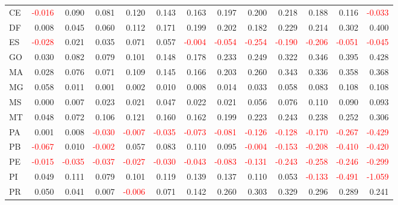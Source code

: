 \begin{table}[!htb]
{\begin{tabular}{lrrrrrrrrrrrr}
      CE & \textcolor{red}{-0.016} & 0.090 & 0.081 & 0.120 & 0.143 & 0.163 & 0.197 & 0.200 & 0.218 & 0.188 & 0.116 & \textcolor{red}{-0.033} \\
      DF & 0.008 & 0.045 & 0.060 & 0.112 & 0.171 & 0.199 & 0.202 & 0.182 & 0.229 & 0.214 & 0.302 & 0.400 \\
      ES & \textcolor{red}{-0.028} & 0.021 & 0.035 & 0.071 & 0.057 & \textcolor{red}{-0.004} & \textcolor{red}{-0.054} & \textcolor{red}{-0.254} & \textcolor{red}{-0.190} & \textcolor{red}{-0.206} & \textcolor{red}{-0.051} & \textcolor{red}{-0.045} \\
      GO & 0.030 & 0.082 & 0.079 & 0.101 & 0.148 & 0.178 & 0.233 & 0.249 & 0.322 & 0.346 & 0.395 & 0.428 \\
      MA & 0.028 & 0.076 & 0.071 & 0.109 & 0.145 & 0.166 & 0.203 & 0.260 & 0.343 & 0.336 & 0.358 & 0.368 \\
      MG & 0.058 & 0.011 & 0.001 & 0.002 & 0.010 & 0.008 & 0.014 & 0.033 & 0.058 & 0.083 & 0.108 & 0.108 \\
      MS & 0.000 & 0.007 & 0.023 & 0.021 & 0.047 & 0.022 & 0.021 & 0.056 & 0.076 & 0.110 & 0.090 & 0.093 \\
      MT & 0.048 & 0.072 & 0.106 & 0.121 & 0.160 & 0.162 & 0.199 & 0.223 & 0.243 & 0.238 & 0.252 & 0.306 \\
      PA & 0.001 & 0.008 & \textcolor{red}{-0.030} & \textcolor{red}{-0.007} & \textcolor{red}{-0.035} & \textcolor{red}{-0.073} & \textcolor{red}{-0.081} & \textcolor{red}{-0.126} & \textcolor{red}{-0.128} & \textcolor{red}{-0.170} & \textcolor{red}{-0.267} & \textcolor{red}{-0.429} \\
      PB & \textcolor{red}{-0.067} & 0.010 & \textcolor{red}{-0.002} & 0.057 & 0.083 & 0.110 & 0.095 & \textcolor{red}{-0.004} & \textcolor{red}{-0.153} & \textcolor{red}{-0.208} & \textcolor{red}{-0.410} & \textcolor{red}{-0.420} \\
      PE & \textcolor{red}{-0.015} & \textcolor{red}{-0.035} & \textcolor{red}{-0.037} & \textcolor{red}{-0.027} & \textcolor{red}{-0.030} & \textcolor{red}{-0.043} & \textcolor{red}{-0.083} & \textcolor{red}{-0.131} & \textcolor{red}{-0.243} & \textcolor{red}{-0.258} & \textcolor{red}{-0.246} & \textcolor{red}{-0.299} \\
      PI & 0.049 & 0.111 & 0.079 & 0.101 & 0.119 & 0.139 & 0.137 & 0.110 & 0.053 & \textcolor{red}{-0.133} & \textcolor{red}{-0.491} & \textcolor{red}{-1.059} \\
      PR & 0.050 & 0.041 & 0.007 & \textcolor{red}{-0.006} & 0.071 & 0.142 & 0.260 & 0.303 & 0.329 & 0.296 & 0.289 & 0.241 \\

\end{tabular}}
\end{table}
